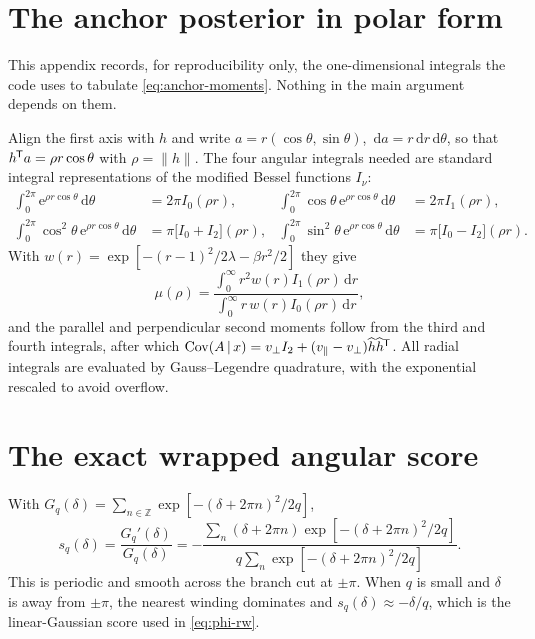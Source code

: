 \documentclass[11pt,a4paper]{article}
\newcommand{\given}{\,\vert\,}
\newcommand{\Cov}{\operatorname{Cov}}
\newcommand{\dd}{\,\mathrm d}
\newcommand{\e}{\mathrm e}
\newcommand{\T}{^{\mkern-1.5mu\mathsf{T}}}
\newcommand{\ohat}{\widehat}
\begin{document}
\appendix
\section{The anchor posterior in polar form}\label{app:anchor}

This appendix records, for reproducibility only, the one-dimensional integrals the code uses
to tabulate \eqref{eq:anchor-moments}. Nothing in the main argument depends on them.

Align the first axis with $h$ and write $a=r(\cos\theta,\sin\theta)$, $\dd a=r\dd r\dd\theta$,
so that $h\T a=\rho r\cos\theta$ with $\rho=\|h\|$. The four angular integrals needed are
standard integral representations of the modified Bessel functions $I_\nu$:
\begin{align}
 \int_0^{2\pi}\e^{\rho r\cos\theta}\dd\theta&=2\pi I_0(\rho r),
 &\int_0^{2\pi}\cos\theta\,\e^{\rho r\cos\theta}\dd\theta&=2\pi I_1(\rho r),\\
 \int_0^{2\pi}\cos^2\theta\,\e^{\rho r\cos\theta}\dd\theta&=\pi\big[I_0+I_2\big](\rho r),
 &\int_0^{2\pi}\sin^2\theta\,\e^{\rho r\cos\theta}\dd\theta&=\pi\big[I_0-I_2\big](\rho r).
\end{align}
With $w(r)=\exp[-(r-1)^2/2\lambda-\beta r^2/2]$ they give
\begin{equation}
 \mu(\rho)=\frac{\int_0^\infty r^2w(r)I_1(\rho r)\dd r}
                {\int_0^\infty r\,w(r)I_0(\rho r)\dd r},
\end{equation}
and the parallel and perpendicular second moments follow from the third and fourth integrals,
after which
$\Cov(A\given x)=v_\perp I_2+(v_\parallel-v_\perp)\ohat h\ohat h\T$. All radial integrals are
evaluated by Gauss--Legendre quadrature, with the exponential rescaled to avoid overflow.

\section{The exact wrapped angular score}\label{app:wrapped}

With $G_q(\delta)=\sum_{n\in\mathbb Z}\exp[-(\delta+2\pi n)^2/2q]$,
\begin{equation}
 s_q(\delta)=\frac{G_q'(\delta)}{G_q(\delta)}
 =-\frac{\sum_n(\delta+2\pi n)\exp[-(\delta+2\pi n)^2/2q]}
        {q\sum_n\exp[-(\delta+2\pi n)^2/2q]} .
\end{equation}
This is periodic and smooth across the branch cut at $\pm\pi$. When $q$ is small and $\delta$
is away from $\pm\pi$, the nearest winding dominates and $s_q(\delta)\approx-\delta/q$, which
is the linear-Gaussian score used in \eqref{eq:phi-rw}.
\end{document}
